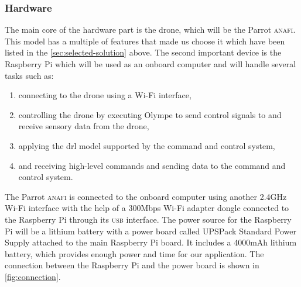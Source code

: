 \documentclass[../main.tex]{subfiles}
\begin{document}
\subsubsection{Hardware}
The main core of the hardware part is the drone, 
which will be the Parrot \textsc{anafi}. This model 
has a multiple of features that made us choose it 
which have been listed in the 
\cref{sec:selected-solution} above. 
The second important device is the Raspberry Pi 
which will be used as an onboard computer and will 
handle several tasks such as:

\begin{enumerate}
    \item connecting to the drone 
        using a Wi-Fi interface,
    \item controlling the drone 
        by executing Olympe to send control signals 
        to and receive sensory data from the drone,
    \item applying the \gls{drl} model supported by 
        the command and control system,
    \item and receiving high-level commands and 
        sending data to the command and control system.
\end{enumerate}
 
The Parrot \textsc{anafi} is connected 
to the onboard computer using another 
2.4GHz Wi-Fi interface with the help of a 
300Mbps Wi-Fi adapter dongle connected to 
the Raspberry Pi through its \textsc{usb} interface. 
The power source for the Raspberry Pi will be a 
lithium battery with a power board called 
\textsc{UPSP}ack Standard Power Supply attached to 
the main Raspberry Pi board. It includes a 4000mAh 
lithium battery, which provides enough power 
and time for our application.
The connection between the Raspberry Pi and 
the power board is shown in \cref{fig:connection}.
\end{document}
